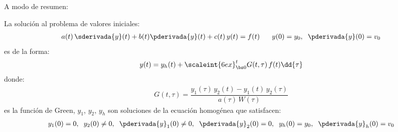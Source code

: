 A modo de resumen:
\begin{tcolorbox}[title={\centering Solución para problema de valores iniciales con la función de Green}]

La solución al problema de valores iniciales:
\begin{align*}
a (t) \, \sderivada{y} (t) + b (t) \pderivada{y} (t) + c (t) \, y (t) = f (t) \hspace{0.6cm} y (0) = y_{0}, \hspace{0.2cm} \pderivada{y} (0) = v_{0}
\end{align*}
es de la forma:
\begin{align}
y (t) = y_{h} (t) + \scaleint{6ex}_{\bs 0}^{t} G (t, \tau) \, f (t) \dd{\tau}
\label{eq:ecuacion_07_21}
\end{align}
donde:
\begin{align}
G (t, \tau) = \dfrac{y_{1} (\tau) \, y_{2} (t) - y_{1} (t) \, y_{2} (\tau)}{a (\tau) \, W (\tau)}
\label{eq:ecuacion_07_22}
\end{align}
es la función de Green, $y_{1}$, $y_{2}$, $y_{h}$ son soluciones de la ecuación homogénea que satisfacen:
\begin{align*}
y_{1} (0) = 0, \hspace{0.2cm} y_{2} (0) \neq 0, \hspace{0.2cm} \pderivada{y}_{1} (0) \neq 0, \hspace{0.2cm} \pderivada{y}_{2} (0) = 0, \hspace{0.2cm} y_{h} (0) = y_{0}, \hspace{0.2cm} \pderivada{y}_{h} (0) = v_{0}
\end{align*}
\end{tcolorbox}

